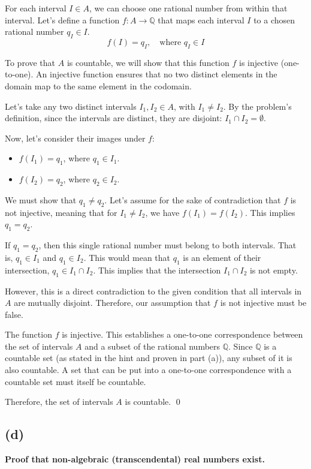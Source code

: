 \documentclass[12pt,a4paper]{article}
\theoremstyle{definition}
\theoremstyle{remark}
\begin{document}
For each interval $I \in A$, we can choose one rational number from within that interval. Let's define a function $f: A \to \mathbb{Q}$ that maps each interval $I$ to a chosen rational number $q_I \in I$.
\[ f(I) = q_I, \quad \text{where } q_I \in I \]

To prove that $A$ is countable, we will show that this function $f$ is injective (one-to-one). An injective function ensures that no two distinct elements in the domain map to the same element in the codomain.

Let's take any two distinct intervals $I_1, I_2 \in A$, with $I_1 \neq I_2$.
By the problem's definition, since the intervals are distinct, they are disjoint: $I_1 \cap I_2 = \emptyset$.

Now, let's consider their images under $f$:
\begin{itemize}
    \item $f(I_1) = q_1$, where $q_1 \in I_1$.
    \item $f(I_2) = q_2$, where $q_2 \in I_2$.
\end{itemize}

We must show that $q_1 \neq q_2$. Let's assume for the sake of contradiction that $f$ is not injective, meaning that for $I_1 \neq I_2$, we have $f(I_1) = f(I_2)$. This implies $q_1 = q_2$.

If $q_1 = q_2$, then this single rational number must belong to both intervals. That is, $q_1 \in I_1$ and $q_1 \in I_2$. This would mean that $q_1$ is an element of their intersection, $q_1 \in I_1 \cap I_2$.
This implies that the intersection $I_1 \cap I_2$ is not empty.

However, this is a direct contradiction to the given condition that all intervals in $A$ are mutually disjoint. Therefore, our assumption that $f$ is not injective must be false.

The function $f$ is injective. This establishes a one-to-one correspondence between the set of intervals $A$ and a subset of the rational numbers $\mathbb{Q}$. Since $\mathbb{Q}$ is a countable set (as stated in the hint and proven in part (a)), any subset of it is also countable.
A set that can be put into a one-to-one correspondence with a countable set must itself be countable.

Therefore, the set of intervals $A$ is countable. \qed


\subsection*{(d)}
\textbf{Proof that non-algebraic (transcendental) real numbers exist.}
\end{document}
